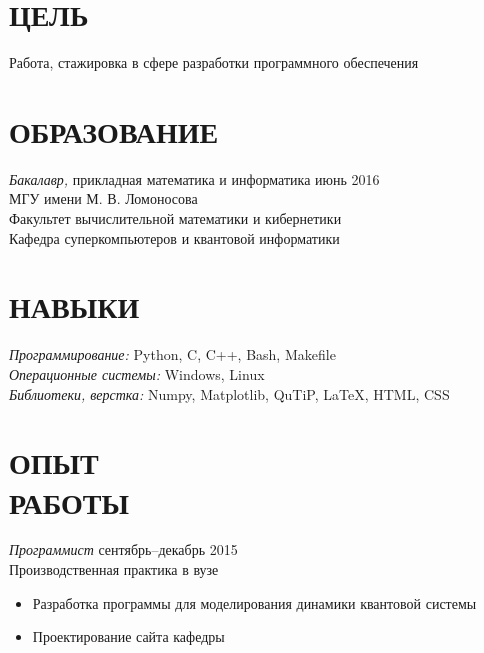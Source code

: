 \documentclass[line,margin]{resume}
\begin{document}
\address{г. Москва, м. Авиамоторная}
\address{+7 926 701-67-94, brudar@bk.ru}

 
\begin{resume}
 
\section{ЦЕЛЬ}       
    Работа, стажировка в сфере разработки программного обеспечения 
 
 
\section{ОБРАЗОВАНИЕ}
    {\sl Бакалавр,} прикладная математика и информатика \hfill июнь 2016 \\
    МГУ имени М. В. Ломоносова \\
    Факультет вычислительной математики и кибернетики \\
    Кафедра суперкомпьютеров и квантовой информатики
 
 
\section{НАВЫКИ}
    {\sl Программирование:}
        Python, C, C++, Bash, Makefile \\
    {\sl Операционные системы:}
        Windows, Linux \\
    {\sl Библиотеки, верстка:}
        Numpy, Matplotlib, QuTiP, \LaTeX, HTML, CSS
 
\section{ОПЫТ \\ РАБОТЫ}
    {\sl Программист} \hfill сентябрь--декабрь 2015 \\
        Производственная практика в вузе
        \begin{itemize}  \itemsep -2pt %
            \item
                Разработка программы для моделирования динамики квантовой системы
            \item
                Проектирование сайта кафедры 
        \end{itemize}


\end{resume}
\end{document}
